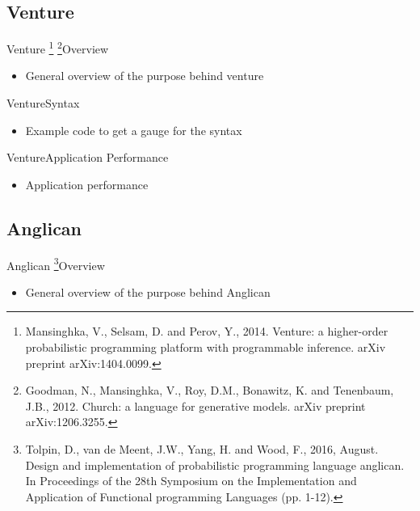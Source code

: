 \documentclass[AERbeamer%
              ,optEnglish%
              ,optBiber%
              ,optBibstyleAlphabetic%
              ,optBeamerClassicFormat%
              ]{AERlatex}%
\begin{document}
\subsection{Venture}
\begin{frame}[c]{Venture \footnote{Mansinghka, V., Selsam, D. and Perov, Y., 2014.
                                   Venture: a higher-order probabilistic programming platform
                                   with programmable inference. arXiv preprint arXiv:1404.0099.}
                         \footnote{Goodman, N., Mansinghka, V., Roy, D.M., Bonawitz, K. and Tenenbaum, J.B., 2012.
                                   Church: a language for generative models. arXiv preprint arXiv:1206.3255.}}{Overview}
    \centering
    \begin{itemize}
        \item General overview of the purpose behind venture
    \end{itemize}
\end{frame}


\begin{frame}[c]{Venture}{Syntax}
    \centering
    \begin{itemize}
        \item Example code to get a gauge for the syntax
    \end{itemize}
\end{frame}


\begin{frame}[c]{Venture}{Application Performance}
    \centering
    \begin{itemize}
        \item Application performance
    \end{itemize}
\end{frame}


\subsection{Anglican}
\begin{frame}[c]{Anglican \footnote{Tolpin, D., van de Meent, J.W., Yang, H. and Wood, F., 2016, August. Design
                                    and implementation of probabilistic programming language anglican. In Proceedings
                                    of the 28th Symposium on the Implementation and Application of Functional
                                    programming Languages (pp. 1-12).}}{Overview}
    \centering
    \begin{itemize}
        \item General overview of the purpose behind Anglican
    \end{itemize}
\end{frame}
\end{document}
